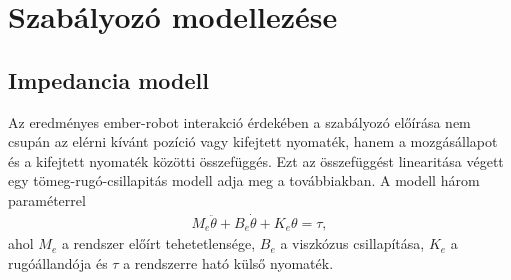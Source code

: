\chapter{Szabályozó modellezése}\label{chap:controller}

\section{Impedancia modell}
Az eredményes ember-robot interakció érdekében a szabályozó előírása nem csupán 
az elérni kívánt pozíció vagy kifejtett nyomaték, hanem a mozgásállapot és a kifejtett
nyomaték közötti összefüggés. Ezt az összefüggést linearitása végett egy 
tömeg-rugó-csillapitás modell adja meg a továbbiakban. A modell három paraméterrel
\begin{align}
    M_e \ddot \theta + B_e \dot \theta + K_e \theta = \tau,
\end{align}
ahol $M_e$ a rendszer előírt tehetetlensége, $B_e$ a viszkózus csillapítása, $K_e$ a rugóállandója 
és $\tau$ a rendszerre ható külső nyomaték. 
